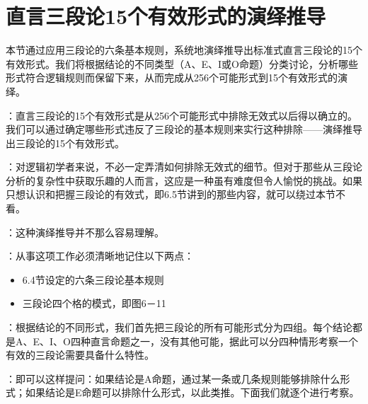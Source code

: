 \section{直言三段论15个有效形式的演绎推导}

\begin{logicbox}[title=引言]
本节通过应用三段论的六条基本规则，系统地演绎推导出标准式直言三段论的15个有效形式。我们将根据结论的不同类型（A、E、I或O命题）分类讨论，分析哪些形式符合逻辑规则而保留下来，从而完成从256个可能形式到15个有效形式的演绎。
\end{logicbox}

：直言三段论的15个有效形式是从256个可能形式中排除无效式以后得以确立的。我们可以通过确定哪些形式违反了三段论的基本规则来实行这种排除——演绎推导出三段论的15个有效形式。

：对逻辑初学者来说，不必一定弄清如何排除无效式的细节。但对于那些从三段论分析的复杂性中获取乐趣的人而言，这应是一种虽有难度但令人愉悦的挑战。如果只想认识和把握三段论的有效式，即6.5节讲到的那些内容，就可以绕过本节不看。

\begin{theorembox}[title=演绎推导的前提条件]
：这种演绎推导并不那么容易理解。

：从事这项工作必须清晰地记住以下两点：
\begin{itemize}
  \item 6.4节设定的六条三段论基本规则
  \item 三段论四个格的模式，即图6－11
\end{itemize}
\end{theorembox}

：根据结论的不同形式，我们首先把三段论的所有可能形式分为四组。每个结论都是A、E、I、O四种直言命题之一，没有其他可能，据此可以分四种情形考察一个有效的三段论需要具备什么特性。

：即可以这样提问：如果结论是A命题，通过某一条或几条规则能够排除什么形式；如果结论是E命题可以排除什么形式，以此类推。下面我们就逐个进行考察。


